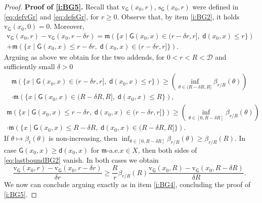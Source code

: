 \documentclass[11pt,a4paper]{article}
\theoremstyle{plain}
\theoremstyle{definition}
\theoremstyle{remark}
\numberwithin{equation}{section}
\newcommand{\cD}{\mathcal{D}}
\newcommand{\rv}{\mathrm{v}}
\newcommand{\rs}{\mathrm{s}}
\newcommand{\mm}{\mathfrak m}
\newcommand{\sfd}{\mathsf d}
\newcommand{\sfG}{\mathsf G}
\begin{document}
\begin{proof}
\textbf{Proof of \ref{i:BG5}.} Recall that  $\rv_{\sfG}(x_0,r)$, $\rs_{\sfG}(x_0,r)$ were defined in  \eqref{eq:defvGr} and \eqref{eq:defsGr}, for $r\geq 0$.
Observe that, by item \ref{i:BG2}, it holds $\rv_{\sfG}(x_0,0)=0$. Moreover,
\begin{multline}
\rv_{\sfG}(x_0,r) -\rv_{\sfG}(x_0,r-\delta r) = \mm\left(\{x\mid\sfG(x_0,x) \in (r-\delta r,r],\; \sfd(x_0,x)\leq r\} \right)\\ +\mm\left(\{x\mid \sfG(x_0,x) \leq r-\delta r,\; \sfd(x_0,x) \in (r-\delta r,r]\} \right).
\end{multline}
Arguing as above we obtain for the two addends, for $0<r<R<\cD$ and sufficiently small $\delta>0$
\begin{multline}\label{eq:lastboundBG1}
\mm\left(\{x\mid\sfG(x_0,x) \in (r-\delta r,r],\; \sfd(x_0,x)\leq r\} \right) \geq \left( \inf_{\theta \in (R-\delta R,R]}\beta_{r/R}(\theta) \right)\\\cdot \mm\left(\{x\mid\sfG(x_0,x) \in (R-\delta R,R],\; \sfd(x_0,x)\leq R\} \right),
\end{multline}
\begin{multline}\label{eq:lastboundBG2}
\mm\left(\{x\mid \sfG(x_0,x) \leq r-\delta r,\; \sfd(x_0,x) \in (r-\delta r,r]\} \right)  \geq \left( \inf_{\theta \in [0,R-\delta R]}\beta_{r/R}(\theta) \right)\\\cdot \mm\left(\{x\mid \sfG(x_0,x) \leq R-\delta R,\; \sfd(x_0,x) \in (R-\delta R,R]\} \right).
\end{multline}
If $\theta \mapsto \beta_t(\theta)$ is non-increasing, then $ \inf_{\theta \in [0,R-\delta R]}\beta_{r/R}(\theta)  \geq \beta_{r/R}(R)$. In case $\sfG(x_0,x)\geq \sfd(x_0,x)$ for $\mm$-a.e.\@ $x\in X$, then both sides of \eqref{eq:lastboundBG2} vanish.  In both cases we obtain
\begin{equation}
\frac{\rv_{\sfG}(x_0,r) -\rv_{\sfG}(x_0,r-\delta r)}{\delta r}   \geq \frac{R}{r}\beta_{r/R}(R) \frac{\rv_{\sfG}(x_0,R) -\rv_{\sfG}(x_0,R-\delta R)}{\delta R}.
\end{equation}
We now can conclude arguing exactly as in item \ref{i:BG4}, concluding the proof of \ref{i:BG5}.


\end{proof}
\end{document}
